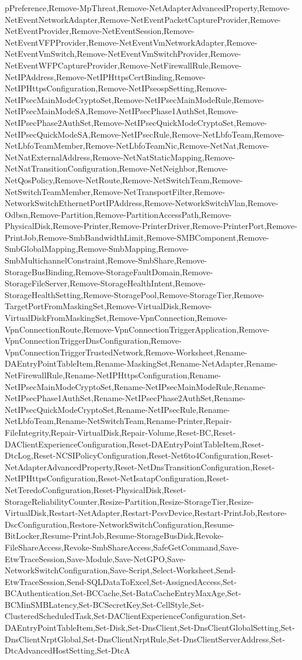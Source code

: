 {{pPreference,Remove-MpThreat,Remove-NetAdapterAdvancedProperty,Remove-NetEventNetworkAdapter,Remove-NetEventPacketCaptureProvider,Remove-NetEventProvider,Remove-NetEventSession,Remove-NetEventVFPProvider,Remove-NetEventVmNetworkAdapter,Remove-NetEventVmSwitch,Remove-NetEventVmSwitchProvider,Remove-NetEventWFPCaptureProvider,Remove-NetFirewallRule,Remove-NetIPAddress,Remove-NetIPHttpsCertBinding,Remove-NetIPHttpsConfiguration,Remove-NetIPseospSetting,Remove-NetIPsecMainModeCryptoSet,Remove-NetIPsecMainModeRule,Remove-NetIPsecMainModeSA,Remove-NetIPsecPhase1AuthSet,Remove-NetIPsecPhase2AuthSet,Remove-NetIPsecQuickModeCryptoSet,Remove-NetIPsecQuickModeSA,Remove-NetIPsecRule,Remove-NetLbfoTeam,Remove-NetLbfoTeamMember,Remove-NetLbfoTeamNic,Remove-NetNat,Remove-NetNatExternalAddress,Remove-NetNatStaticMapping,Remove-NetNatTransitionConfiguration,Remove-NetNeighbor,Remove-NetQosPolicy,Remove-NetRoute,Remove-NetSwitchTeam,Remove-NetSwitchTeamMember,Remove-NetTransportFilter,Remove-NetworkSwitchEthernetPortIPAddress,Remove-NetworkSwitchVlan,Remove-Odbsn,Remove-Partition,Remove-PartitionAccessPath,Remove-PhysicalDisk,Remove-Printer,Remove-PrinterDriver,Remove-PrinterPort,Remove-PrintJob,Remove-SmbBandwidthLimit,Remove-SMBComponent,Remove-SmbGlobalMapping,Remove-SmbMapping,Remove-SmbMultichannelConstraint,Remove-SmbShare,Remove-StorageBusBinding,Remove-StorageFaultDomain,Remove-StorageFileServer,Remove-StorageHealthIntent,Remove-StorageHealthSetting,Remove-StoragePool,Remove-StorageTier,Remove-TargetPortFromMaskingSet,Remove-VirtualDisk,Remove-VirtualDiskFromMaskingSet,Remove-VpnConnection,Remove-VpnConnectionRoute,Remove-VpnConnectionTriggerApplication,Remove-VpnConnectionTriggerDnsConfiguration,Remove-VpnConnectionTriggerTrustedNetwork,Remove-Worksheet,Rename-DAEntryPointTableItem,Rename-MaskingSet,Rename-NetAdapter,Rename-NetFirewallRule,Rename-NetIPHttpsConfiguration,Rename-NetIPsecMainModeCryptoSet,Rename-NetIPsecMainModeRule,Rename-NetIPsecPhase1AuthSet,Rename-NetIPsecPhase2AuthSet,Rename-NetIPsecQuickModeCryptoSet,Rename-NetIPsecRule,Rename-NetLbfoTeam,Rename-NetSwitchTeam,Rename-Printer,Repair-FileIntegrity,Repair-VirtualDisk,Repair-Volume,Reset-BC,Reset-DAClientExperienceConfiguration,Reset-DAEntryPointTableItem,Reset-DtcLog,Reset-NCSIPolicyConfiguration,Reset-Net6to4Configuration,Reset-NetAdapterAdvancedProperty,Reset-NetDnsTransitionConfiguration,Reset-NetIPHttpsConfiguration,Reset-NetIsatapConfiguration,Reset-NetTeredoConfiguration,Reset-PhysicalDisk,Reset-StorageReliabilityCounter,Resize-Partition,Resize-StorageTier,Resize-VirtualDisk,Restart-NetAdapter,Restart-PcsvDevice,Restart-PrintJob,Restore-DscConfiguration,Restore-NetworkSwitchConfiguration,Resume-BitLocker,Resume-PrintJob,Resume-StorageBusDisk,Revoke-FileShareAccess,Revoke-SmbShareAccess,SafeGetCommand,Save-EtwTraceSession,Save-Module,Save-NetGPO,Save-NetworkSwitchConfiguration,Save-Script,Select-Worksheet,Send-EtwTraceSession,Send-SQLDataToExcel,Set-AssignedAccess,Set-BCAuthentication,Set-BCCache,Set-BataCacheEntryMaxAge,Set-BCMinSMBLatency,Set-BCSecretKey,Set-CellStyle,Set-ClusteredScheduledTask,Set-DAClientExperienceConfiguration,Set-DAEntryPointTableItem,Set-Disk,Set-DnsClient,Set-DnsClientGlobalSetting,Set-DnsClientNrptGlobal,Set-DnsClientNrptRule,Set-DnsClientServerAddress,Set-DtcAdvancedHostSetting,Set-DtcA}}
